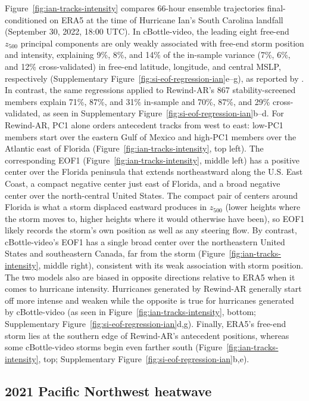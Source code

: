 \documentclass{article}
\begin{document}
Figure~\ref{fig:ian-tracks-intensity} compares 66-hour ensemble trajectories final-conditioned on ERA5 at the time of Hurricane Ian's South Carolina landfall (September 30, 2022, 18:00 UTC). In cBottle-video, the leading eight free-end $z_{500}$ principal components are only weakly associated with free-end storm position and intensity, explaining 9\%, 8\%, and 14\% of the in-sample variance (7\%, 6\%, and 12\% cross-validated) in free-end latitude, longitude, and central MSLP, respectively (Supplementary Figure~\ref{fig:si-eof-regression-ian}e--g), as reported by \citet{Lin2026-sz}. In contrast, the same regressions applied to Rewind-AR's 867 stability-screened members explain 71\%, 87\%, and 31\% in-sample and 70\%, 87\%, and 29\% cross-validated, as seen in Supplementary Figure~\ref{fig:si-eof-regression-ian}b--d. For Rewind-AR, PC1 alone orders antecedent tracks from west to east: low-PC1 members start over the eastern Gulf of Mexico and high-PC1 members over the Atlantic east of Florida (Figure~\ref{fig:ian-tracks-intensity}, top left). The corresponding EOF1 (Figure~\ref{fig:ian-tracks-intensity}, middle left) has a positive center over the Florida peninsula that extends northeastward along the U.S. East Coast, a compact negative center just east of Florida, and a broad negative center over the north-central United States. The compact pair of centers around Florida is what a storm displaced eastward produces in $z_{500}$ (lower heights where the storm moves to, higher heights where it would otherwise have been), so EOF1 likely records the storm's own position as well as any steering flow. By contrast, cBottle-video's EOF1 has a single broad center over the northeastern United States and southeastern Canada, far from the storm (Figure~\ref{fig:ian-tracks-intensity}, middle right), consistent with its weak association with storm position. The two models also are biased in opposite directions relative to ERA5 when it comes to hurricane intensity. Hurricanes generated by Rewind-AR generally start off more intense and weaken while the opposite is true for hurricanes generated by cBottle-video (as seen in Figure~\ref{fig:ian-tracks-intensity}, bottom; Supplementary Figure~\ref{fig:si-eof-regression-ian}d,g). Finally, ERA5's free-end storm lies at the southern edge of Rewind-AR's antecedent positions, whereas some cBottle-video storms begin even farther south (Figure~\ref{fig:ian-tracks-intensity}, top; Supplementary Figure~\ref{fig:si-eof-regression-ian}b,e).

\subsection{2021 Pacific Northwest heatwave}
\end{document}

